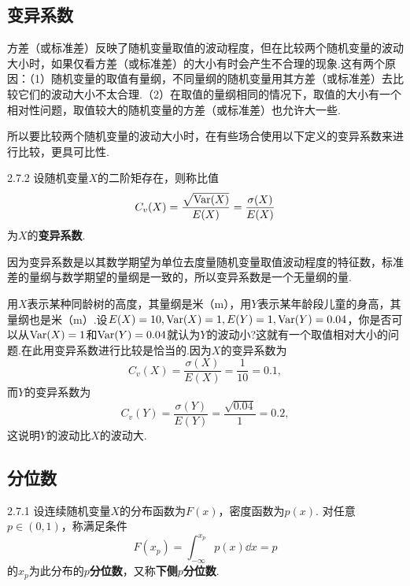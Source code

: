 \subsection{变异系数}
方差（或标准差）反映了随机变量取值的波动程度，但在比较两个随机变量的波动大小时，如果仅看方差（或标准差）的大小有时会产生不合理的现象.这有两个原因：（1）随机变量的取值有量纲，不同量纲的随机变量用其方差（或标准差）去比较它们的波动大小不太合理.（2）在取值的量纲相同的情况下，取值的大小有一个相对性问题，取值较大的随机变量的方差（或标准差）也允许大一些.

所以要比较两个随机变量的波动大小时，在有些场合使用以下定义的变异系数来进行比较，更具可比性.

\begin{definition}{}{2.7.2}
  设随机变量$X$的二阶矩存在，则称比值
  \begin{equation}\label{eq2.7.3}
    C_v(X) = \frac{\sqrt{\operatorname{Var}(X)}}{E(X)} = \frac{\sigma(X)}{E(X)}
  \end{equation}
  为$X$的\textbf{变异系数}.
\end{definition}

因为变异系数是以其数学期望为单位去度量随机变量取值波动程度的特征数，标准差的量纲与数学期望的量纲是一致的，所以变异系数是一个无量纲的量.

\begin{example}
  用$X$表示某种同龄树的高度，其量纲是米（m），用$Y$表示某年龄段儿童的身高，其量纲也是米（m）.设$E(X)=10,\operatorname{Var}(X)=1,E(Y)=1,\operatorname{Var}(Y)=0.04$，你是否可以从$\operatorname{Var}(X)=1$和$\operatorname{Var}(Y)=0.04$就认为$Y$的波动小?这就有一个取值相对大小的问题.在此用变异系数进行比较是恰当的.因为$X$的变异系数为
  \[
    C_v(X) = \frac{\sigma(X)}{E(X)} = \frac1{10} = 0.1,
  \]
  而$Y$的变异系数为
  \[
    C_v(Y) = \frac{\sigma(Y)}{E(Y)} = \frac{\sqrt{0.04}}1 = 0.2,
  \]
  这说明$Y$的波动比$X$的波动大.
\end{example}

\subsection{分位数}
\begin{definition}{}{2.7.1}
  设连续随机变量$X$的分布函数为$F(x)$，密度函数为$p(x)$. 对任意$p\in(0,1)$，称满足条件
  \begin{equation}\label{eq2.7.4}
    F(x_p) = \int_{-\infty}^{x_p}p(x)\dd x = p
  \end{equation}
  的$x_p$为此分布的\textbf{$p$分位数}，又称\textbf{下侧$p$分位数}.
\end{definition}

